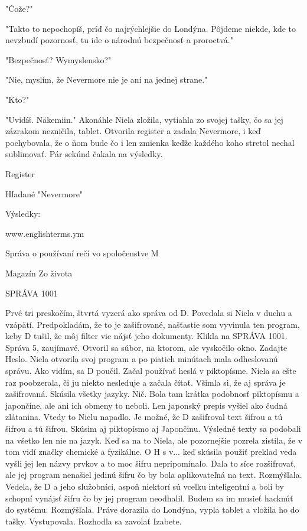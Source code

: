\documentclass{book}
\begin{document}
"$ $Čože?"

"$ $Takto to nepochopíš, príď čo najrýchlejšie do Londýna. Pôjdeme niekde, kde to nevzbudí pozornosť, tu ide o národnú bezpečnosť a proroctvá."

"$ $Bezpečnosť? Wymyslensko?"

"$ $Nie, myslím, že Nevermore nie je ani na jednej strane."

"$ $Kto?"

"$ $Uvidíš. Näkemiin."$ $ Akonáhle Niela zložila, vytiahla zo svojej tašky, čo sa jej zázrakom nezničila, tablet. Otvorila register a zadala Nevermore, i keď pochybovala, že o ňom bude čo i len zmienka keďže každého koho stretol nechal sublimovať. Pár sekúnd čakala na výsledky.

Register

Hľadané "$ $Nevermore"

Výsledky:

www.englishterms.ym

Správa o používaní rečí vo spoločenstve M

Magazín Zo života

SPRÁVA 1001

Prvé tri preskočím, štvrtá vyzerá ako správa od D. Povedala si Niela v duchu a vzápätí. Predpokladám, že to je zašifrované, našťastie som vyvinula ten program, keby D tušil, že môj filter vie nájsť jeho dokumenty. Klikla na SPRÁVA 1001. Správa 5, zaujímavé. Otvoril sa súbor, na ktorom, ale vyskočilo okno. Zadajte Heslo. Niela otvorila svoj program a po piatich minútach mala odheslovanú správu. Ako vidím, sa D poučil. Začal používať heslá v piktopísme. Niela sa ešte raz poobzerala, či ju niekto nesleduje a začala čítať. Všimla si, že aj správa je zašifrovaná. Skúsila všetky jazyky. Nič. Bola tam krátka podobnosť piktopísmu a japončine, ale ani ich obmeny to neboli. Len japonský prepis vyšiel ako čudná zlátanina. Vtedy to Nielu napadlo. Je možné, že D zašifroval text šifrou a tú šifrou a tú šifrou. Skúsim aj piktopísmo aj Japončinu. Výsledné texty sa podobali na všetko len nie na jazyk. Keď sa na to Niela, ale pozornejšie pozrela zistila, že v tom vidí značky chemické a fyzikálne. O H s v... keď skúsila použiť preklad veda vyšli jej len názvy prvkov a to moc šifru nepripomínalo. Dala to síce rozšifrovať, ale jej program nenašiel jedinú šifru čo by bola aplikovateľná na text. Rozmýšľala. Vedela, že D a jeho služobníci, aspoň niektorí sú vcelku inteligentní a boli by schopní vynájsť šifru čo by jej program neodhalil. Budem sa im musieť hacknúť do systému. Rozmýšľala. Práve dorazila do Londýna, vypla tablet a vložila ho do tašky. Vystupovala. Rozhodla sa zavolať Izabete.
\end{document}
